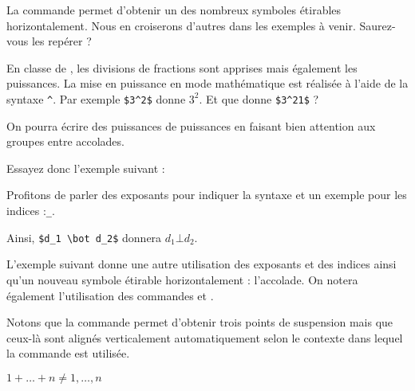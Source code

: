 
\begin{info}
    La commande  permet d'obtenir un des nombreux symboles étirables horizontalement. Nous en croiserons d'autres dans les exemples à venir. Saurez-vous les repérer ?
\end{info}

En classe de , les divisions de fractions sont apprises mais également les puissances. La mise en puissance en mode mathématique est réalisée à l'aide de la syntaxe \verb+^+. Par exemple \verb!$3^2$! donne $3^2$. Et que donne \verb!$3^21$! ?

\begin{info}
    On pourra écrire des puissances de puissances en faisant bien attention aux groupes entre accolades.
\end{info}

Essayez donc l'exemple suivant :


Profitons de parler des exposants pour indiquer la syntaxe et un exemple pour les indices :\linebreak {}\verb!_!.\par Ainsi, \verb!$d_1 \bot d_2$! donnera $d_1 \bot d_2$.\medskip

L'exemple suivant donne une autre utilisation des exposants et des indices ainsi qu'un nouveau symbole étirable horizontalement : l'accolade. On notera également l'utilisation des commandes  et .


\begin{info}
    Notons que la commande  permet d'obtenir trois points de suspension mais que ceux-là sont alignés verticalement automatiquement selon le contexte dans lequel la commande est utilisée.
\end{info}\bigskip

{\NewFont
\begin{SideBySideExample}
    $1 + \dots + n \neq
    1, \dots, n$
\end{SideBySideExample}
}\bigskip

